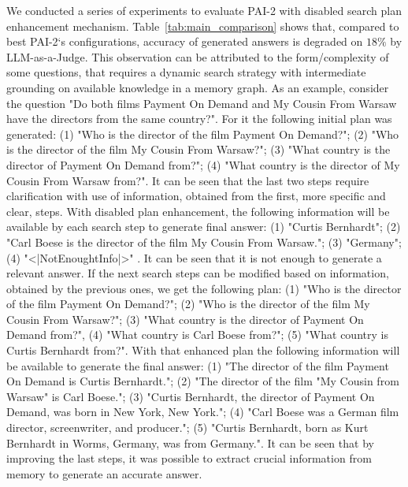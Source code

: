 We conducted a series of experiments to evaluate PAI-2 with disabled search plan enhancement mechanism. Table~\ref{tab:main_comparison} shows that, compared to best PAI-2`s configurations, accuracy of generated answers is degraded on $18\%$ by LLM-as-a-Judge. This observation can be attributed to the form/complexity of some questions, that requires a dynamic search strategy with intermediate grounding on available knowledge in a memory graph. As an example, consider the question "Do both films Payment On Demand and My Cousin From Warsaw have the directors from the same country?". For it  the following initial plan was generated: (1) "Who is the director of the film Payment On Demand?"; (2) "Who is the director of the film My Cousin From Warsaw?"; (3) "What country is the director of Payment On Demand from?"; (4) "What country is the director of My Cousin From Warsaw from?". It can be seen that the last two steps require clarification with use of information, obtained from the first, more specific and clear, steps. With disabled plan enhancement, the following information will be available by each search step to generate final answer: (1) "Curtis Bernhardt"; (2) "Carl Boese is the director of the film My Cousin From Warsaw."; (3) "Germany"; (4) "<|NotEnoughtInfo|>" . It can be seen that it is not enough to generate a relevant answer. If the next search steps can be modified based on information, obtained by the previous ones, we get the following plan: (1) "Who is the director of the film Payment On Demand?"; (2) "Who is the director of the film My Cousin From Warsaw?"; (3) "What country is the director of Payment On Demand from?", (4) "What country is Carl Boese from?"; (5) "What country is Curtis Bernhardt from?". With that enhanced plan the following information will be available to generate the final answer: (1) "The director of the film Payment On Demand is Curtis Bernhardt."; (2) "The director of the film "My Cousin from Warsaw" is Carl Boese."; (3) "Curtis Bernhardt, the director of Payment On Demand, was born in New York, New York."; (4) "Carl Boese was a German film director, screenwriter, and producer."; (5) "Curtis Bernhardt, born as Kurt Bernhardt in Worms, Germany, was from Germany.". It can be seen that by improving the last steps, it was possible to extract crucial information from memory to generate an accurate answer.

